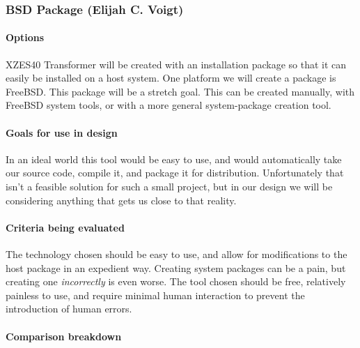 \subsubsection{BSD Package (Elijah C. Voigt)}

\paragraph{Options}

XZES40 Transformer will be created with an installation package so that it can easily be installed on a host system.
One platform we will create a package is FreeBSD.
This package will be a stretch goal.
This can be created manually, with FreeBSD system tools, or with a more general system-package creation tool.

\paragraph{Goals for use in design}

In an ideal world this tool would be easy to use, and would automatically take our source code, compile it, and package it for distribution.
Unfortunately that isn't a feasible solution for such a small project, but in our design we will be considering anything that gets us close to that reality.

\paragraph{Criteria being evaluated}

The technology chosen should be easy to use, and allow for modifications to the host package in an expedient way.
Creating system packages can be a pain, but creating one \textit{incorrectly} is even worse.
The tool chosen should be free, relatively painless to use, and require minimal human interaction to prevent the introduction of human errors.

\paragraph{Comparison breakdown}

